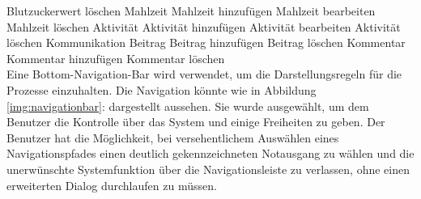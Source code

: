 \noindent\hspace*{20mm}Blutzuckerwert löschen\newline
\noindent\hspace*{10mm}Mahlzeit\newline
\noindent\hspace*{20mm}Mahlzeit hinzufügen\newline
\noindent\hspace*{20mm}Mahlzeit bearbeiten\newline 
\noindent\hspace*{20mm}Mahlzeit löschen\newline
\noindent\hspace*{10mm}Aktivität\newline
\noindent\hspace*{20mm}Aktivität hinzufügen\newline
\noindent\hspace*{20mm}Aktivität bearbeiten\newline
\noindent\hspace*{20mm}Aktivität löschen\newline
Kommunikation\newline
\noindent\hspace*{10mm}Beitrag\newline
\noindent\hspace*{20mm}Beitrag hinzufügen\newline
\noindent\hspace*{20mm}Beitrag löschen\newline
\noindent\hspace*{10mm}Kommentar\newline
\noindent\hspace*{20mm}Kommentar hinzufügen\newline
\noindent\hspace*{20mm}Kommentar löschen\\
Eine Bottom-Navigation-Bar wird verwendet, um die Darstellungsregeln für die Prozesse einzuhalten. Die Navigation könnte wie in Abbildung \ref{img:navigationbar}: \glqq {}\grqq{} dargestellt aussehen. Sie wurde ausgewählt, um dem Benutzer die Kontrolle über das System und einige Freiheiten zu geben.\newline
Der Benutzer hat die Möglichkeit, bei versehentlichem Auswählen eines Navigationspfades einen deutlich gekennzeichneten \glqq Notausgang\grqq{} zu wählen und die unerwünschte Systemfunktion über die Navigationsleiste zu verlassen, ohne einen erweiterten Dialog durchlaufen zu müssen.
